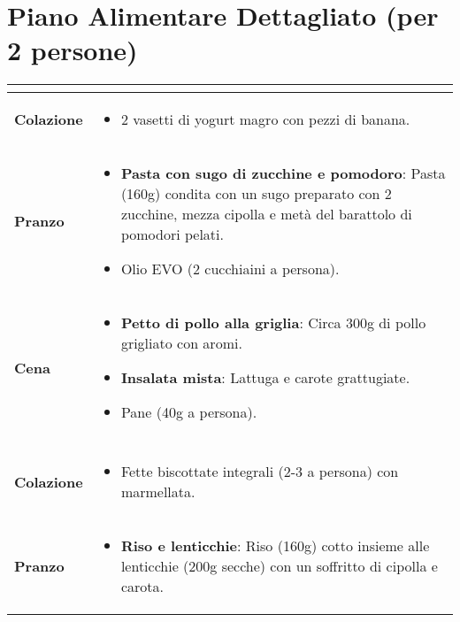 \documentclass[a4paper, 11pt]{article}
\begin{document}
\newpage

\section{Piano Alimentare Dettagliato (per 2 persone)}

\renewcommand{\arraystretch}{1.5}
\begin{tabular}{|>{\bfseries}m{2.5cm}|m{12.5cm}|}
\hline
\multicolumn{2}{|c|}{\cellcolor{lightgray}\bfseries LUNEDÌ} \\
\hline
\textbf{Colazione} & 
\begin{itemize}[noitemsep, topsep=0pt, leftmargin=*]
    \item 2 vasetti di yogurt magro con pezzi di banana.
\end{itemize} \\
\hline
\textbf{Pranzo} & 
\begin{itemize}[noitemsep, topsep=0pt, leftmargin=*]
    \item \textbf{Pasta con sugo di zucchine e pomodoro}: Pasta (160g) condita con un sugo preparato con 2 zucchine, mezza cipolla e metà del barattolo di pomodori pelati.
    \item Olio EVO (2 cucchiaini a persona).
\end{itemize} \\
\hline
\textbf{Cena} & 
\begin{itemize}[noitemsep, topsep=0pt, leftmargin=*]
    \item \textbf{Petto di pollo alla griglia}: Circa 300g di pollo grigliato con aromi.
    \item \textbf{Insalata mista}: Lattuga e carote grattugiate.
    \item Pane (40g a persona).
\end{itemize} \\
\hline
\multicolumn{2}{|c|}{\cellcolor{lightgray}\bfseries MARTEDÌ} \\
\hline
\textbf{Colazione} & 
\begin{itemize}[noitemsep, topsep=0pt, leftmargin=*]
    \item Fette biscottate integrali (2-3 a persona) con marmellata.
\end{itemize} \\
\hline
\textbf{Pranzo} & 
\begin{itemize}[noitemsep, topsep=0pt, leftmargin=*]
    \item \textbf{Riso e lenticchie}: Riso (160g) cotto insieme alle lenticchie (200g secche) con un soffritto di cipolla e carota.

\end{itemize}
\end{tabular}
\end{document}
